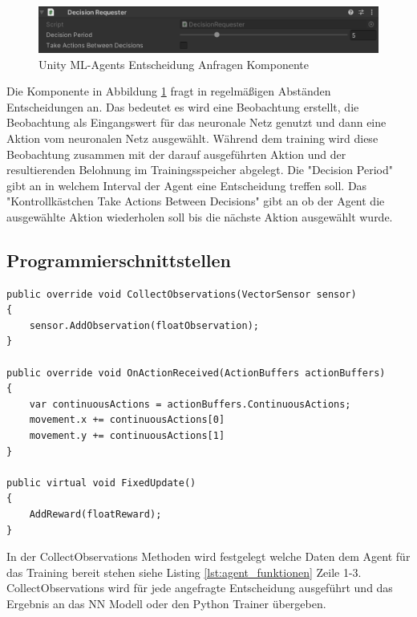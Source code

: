 \begin{figure}[H]
  \centering  
  \includegraphics[scale=0.5]{img/entscheidung_anfragen_komponente.png}
  \caption{Unity ML-Agents Entscheidung Anfragen Komponente}
  \label{fig:entscheidung_anfragen_komponente}
\end{figure}

Die Komponente in Abbildung \ref{fig:entscheidung_anfragen_komponente} fragt in regelmäßigen Abständen Entscheidungen an. Das bedeutet es wird eine Beobachtung erstellt, die Beobachtung als Eingangswert für das neuronale Netz genutzt und dann eine Aktion vom neuronalen Netz ausgewählt. Während dem training wird diese Beobachtung zusammen mit der darauf ausgeführten Aktion und der resultierenden Belohnung im Trainingsspeicher abgelegt. Die "Decision Period" gibt an in welchem Interval der Agent eine Entscheidung treffen soll. Das "Kontrollkästchen Take Actions Between Decisions" gibt an ob der Agent die ausgewählte Aktion wiederholen soll bis die nächste Aktion ausgewählt wurde.

\subsection{Programmierschnittstellen}
\label{subsec:programmierschnittstellen}

\begin{lstlisting}[caption={Agent Funktionen},captionpos=b,label={lst:agent_funktionen}]
public override void CollectObservations(VectorSensor sensor)
{
    sensor.AddObservation(floatObservation);
}

public override void OnActionReceived(ActionBuffers actionBuffers)
{
    var continuousActions = actionBuffers.ContinuousActions;
    movement.x += continuousActions[0]
    movement.y += continuousActions[1]
}

public virtual void FixedUpdate()
{
    AddReward(floatReward);
}
\end{lstlisting}

In der CollectObservations Methoden wird festgelegt welche Daten dem Agent für das Training bereit stehen siehe Listing \ref{lst:agent_funktionen} Zeile 1-3. CollectObservations wird für jede angefragte Entscheidung ausgeführt und das Ergebnis an das NN Modell oder den Python Trainer übergeben.

